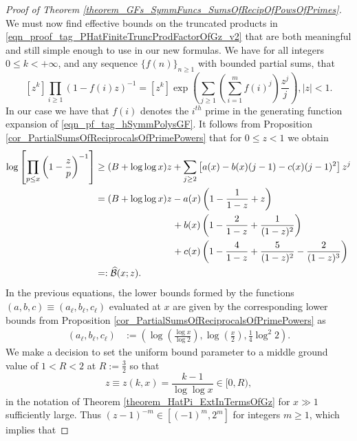 \documentclass[11pt,reqno,a4letter]{article}
\numberwithin{figure}{section}
\numberwithin{table}{section}
\theoremstyle{plain}
\numberwithin{theorem}{section}
\theoremstyle{definition}
\begin{document}
\begin{proof}[Proof of Theorem \ref{theorem_GFs_SymmFuncs_SumsOfRecipOfPowsOfPrimes}]
We must now find effective bounds on the truncated products in 
\eqref{eqn_proof_tag_PHatFiniteTruncProdFactorOfGz_v2} 
that are both meaningful and still simple enough to use in our new formulas. 
We have for all integers $0 \leq k < +\infty$, and any sequence 
$\{f(n)\}_{n \geq 1}$ with bounded partial sums, that 
\cite[\S 2]{MACDONALD-SYMFUNCS} 
\begin{equation} 
\label{eqn_pf_tag_hSymmPolysGF} 
[z^k] \prod_{i \geq 1} (1-f(i) z)^{-1} = [z^k] \exp\left(\sum_{j \geq 1} 
     \left(\sum_{i=1}^m f(i)^j\right) \frac{z^j}{j}\right), |z| < 1. 
\end{equation} 
In our case we have that $f(i)$ denotes the $i^{th}$ prime in the 
generating function expansion of \eqref{eqn_pf_tag_hSymmPolysGF}. 
It follows from Proposition \ref{cor_PartialSumsOfReciprocalsOfPrimePowers} that 
for $0 \leq z < 1$ we obtain 
\begin{align} 
\notag 
\log\left[\prod_{p \leq x} \left(1-\frac{z}{p}\right)^{-1}\right] & \geq (B + \log\log x) z + 
     \sum_{j \geq 2} \left[a(x) - b(x)(j-1) - c(x) (j-1)^2\right] z^j \\ 
\notag 
     & = (B + \log\log x) z - a(x) \left(1 - \frac{1}{1-z} + z\right) \\ 
\notag 
     & \phantom{= (B + \log\log x) z\ } + 
     b(x) \left( 
     1 - \frac{2}{1-z} + \frac{1}{(1-z)^2}\right) \\ 
\notag 
     & \phantom{= (B + \log\log x) z\ } + 
     c(x) \left( 
     1 - \frac{4}{1-z} + \frac{5}{(1-z)^2} - \frac{2}{(1-z)^3}\right) \\ 
\label{eqn_proof_tag_PHatFiniteTruncProdFactorOfGz_v3} 
     & =: \widehat{\mathcal{B}}(x; z). 
\end{align} 
In the previous equations, the lower bounds formed by the functions 
$(a,b,c) \equiv (a_{\ell}, b_{\ell}, c_{\ell})$ 
evaluated at $x$ are given by the corresponding lower bounds from 
Proposition \ref{cor_PartialSumsOfReciprocalsOfPrimePowers} as 
\begin{align*} 
(a_{\ell}, b_{\ell}, c_{\ell}) & := \left(\log\left(\frac{\log x}{\log 2}\right), 
     \log\left(\frac{x}{2}\right), \frac{1}{4} \log^2 2\right). 
\end{align*} 
We make a decision to set the uniform bound parameter to a middle ground value of 
$1 < R < 2$ at $R := \frac{3}{2}$ 
so that $$z \equiv z(k, x) = \frac{k-1}{\log\log x} \in [0, R),$$ 
in the notation of Theorem \ref{theorem_HatPi_ExtInTermsOfGz} 
for $x \gg 1$ sufficiently large. 
Thus $(z-1)^{-m} \in [(-1)^m, 2^m]$ for integers $m \geq 1$, which implies that 

\end{proof}
\end{document}
